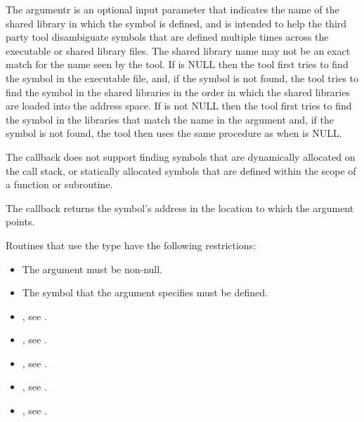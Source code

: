 The  argumentr is an optional input parameter that indicates the 
name of the shared library in which the symbol is defined, and is intended to 
help the third party tool disambiguate symbols that are defined multiple times 
across the executable or shared library files. The shared library name may not 
be an exact match for the name seen by the tool. If  is NULL then
the tool first tries to find the symbol in the executable file, and, if the 
symbol is not found, the tool tries to find the symbol in the shared libraries 
in the order in which the shared libraries are loaded into the address space. 
If  is not NULL then the tool first tries to find the symbol in 
the libraries that match the name in the  argument and, if the 
symbol is not found, the tool then uses the same procedure as when 
 is NULL.

The callback does not support finding symbols that are dynamically allocated on 
the call stack, or statically allocated symbols that are defined within the scope 
of a function or subroutine.

The callback returns the symbol's address in the location to which
the  argument points.

\restrictions
Routines that use the  type have
the following restrictions:

\begin{itemize}
\item The  argument must be non-null.
\item The symbol that the  argument specifies must be defined. 
\end{itemize}

\crossreferences
\begin{itemize}
\item {}, see .

\item {}, 
see .

\item {}, see .

\item {}, see .

\item {}, see .
\end{itemize}



